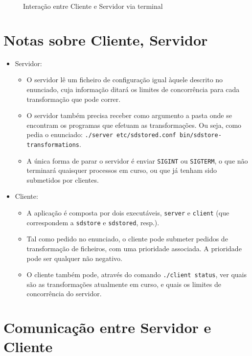 \documentclass[11pt,a4paper]{report}%
\begin{document}
\begin{figure}
  \centering
  
  \caption{Interação entre Cliente e Servidor via terminal}
\end{figure}

\newpage

\section{Notas sobre Cliente, Servidor}

\begin{itemize}
  \item Servidor:
  \begin{itemize}
    \item O servidor lê um ficheiro de configuração igual àquele descrito no enunciado,
    cuja informação ditará os limites de concorrência para cada transformação que pode correr.
    \item O servidor também precisa receber como argumento a pasta onde se encontram
    os programas que efetuam as transformações. Ou seja, como pedia o enunciado:
    \texttt{./server etc/sdstored.conf bin/sdstore-transformations}.
    \item A única forma de parar o servidor é enviar \texttt{SIGINT} ou \texttt{SIGTERM},
    o que não terminará quaisquer processos em curso, ou que já tenham sido submetidos por clientes.
  \end{itemize}

  \item Cliente:
  \begin{itemize}
    \item A aplicação é composta por dois executáveis, \texttt{server} e \texttt{client}
    (que correspondem a \texttt{sdstore} e \texttt{sdstored}, resp.).
    \item Tal como pedido no enunciado, o cliente pode submeter pedidos de transformação
    de ficheiros, com uma prioridade associada. A prioridade pode ser qualquer não negativo.
    \item O cliente também pode, através do comando \texttt{./client status}, ver quais são as
    transformações atualmente em curso, e quais os limites de concorrência do servidor.
  \end{itemize}
\end{itemize}

\section{Comunicação entre Servidor e Cliente}
\end{document}
